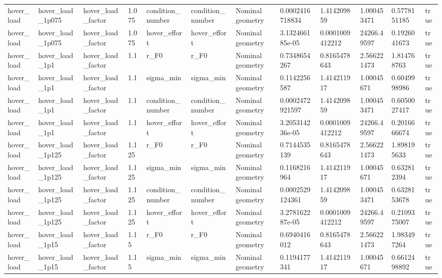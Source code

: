\begin{tabular}{@{}llllllllllll@{}}
hover\_load & hover\_load\_1p075 & hover\_load\_factor & 1.075 & condition\_number & condition\_number & Nominal geometry & 0.0002416718834 & 1.414209859 & 1.000453471 & 0.5778151185 & true \\
hover\_load & hover\_load\_1p075 & hover\_load\_factor & 1.075 & hover\_effort & hover\_effort & Nominal geometry & 3.132466185e-05 & 0.0001009412212 & 24266.49597 & 0.1926041673 & true \\
hover\_load & hover\_load\_1p1 & hover\_load\_factor & 1.1 & r\_F0 & r\_F0 & Nominal geometry & 0.7348654267 & 0.8165478643 & 2.566221473 & 1.814768763 & true \\
hover\_load & hover\_load\_1p1 & hover\_load\_factor & 1.1 & sigma\_min & sigma\_min & Nominal geometry & 0.1142256587 & 1.414211917 & 1.00045671 & 0.6049998986 & true \\
hover\_load & hover\_load\_1p1 & hover\_load\_factor & 1.1 & condition\_number & condition\_number & Nominal geometry & 0.0002472921597 & 1.414209859 & 1.000453471 & 0.6050027417 & true \\
hover\_load & hover\_load\_1p1 & hover\_load\_factor & 1.1 & hover\_effort & hover\_effort & Nominal geometry & 3.205314236e-05 & 0.0001009412212 & 24266.49597 & 0.2016666674 & true \\
hover\_load & hover\_load\_1p125 & hover\_load\_factor & 1.125 & r\_F0 & r\_F0 & Nominal geometry & 0.7144535139 & 0.8165478643 & 2.566221473 & 1.898195633 & true \\
hover\_load & hover\_load\_1p125 & hover\_load\_factor & 1.125 & sigma\_min & sigma\_min & Nominal geometry & 0.1168216964 & 1.414211917 & 1.00045671 & 0.632812394 & true \\
hover\_load & hover\_load\_1p125 & hover\_load\_factor & 1.125 & condition\_number & condition\_number & Nominal geometry & 0.0002529124361 & 1.414209859 & 1.000453471 & 0.6328153678 & true \\
hover\_load & hover\_load\_1p125 & hover\_load\_factor & 1.125 & hover\_effort & hover\_effort & Nominal geometry & 3.278162287e-05 & 0.0001009412212 & 24266.49597 & 0.2109375007 & true \\
hover\_load & hover\_load\_1p15 & hover\_load\_factor & 1.15 & r\_F0 & r\_F0 & Nominal geometry & 0.6940416012 & 0.8165478643 & 2.566221473 & 1.983497264 & true \\
hover\_load & hover\_load\_1p15 & hover\_load\_factor & 1.15 & sigma\_min & sigma\_min & Nominal geometry & 0.1194177341 & 1.414211917 & 1.00045671 & 0.6612498892 & true \\

\end{tabular}
